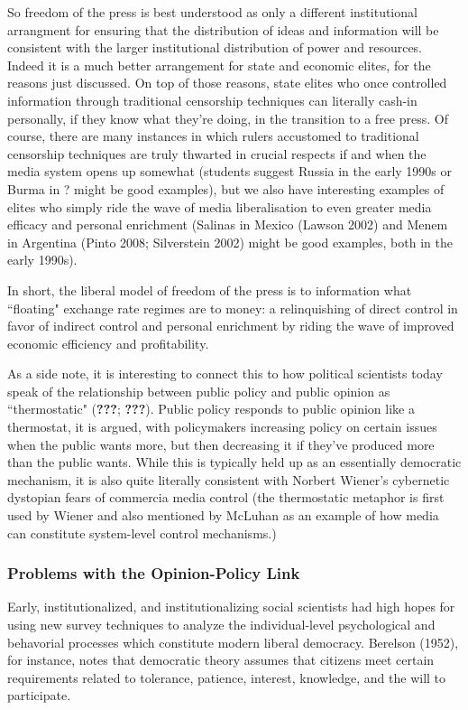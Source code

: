 \documentclass[12pt,book]{article}
\begin{document}
So freedom of the press is best understood as only a different
institutional arrangment for ensuring that the distribution of ideas and
information will be consistent with the larger institutional
distribution of power and resources. Indeed it is a much better
arrangement for state and economic elites, for the reasons just
discussed. On top of those reasons, state elites who once controlled
information through traditional censorship techniques can literally
cash-in personally, if they know what they're doing, in the transition
to a free press. Of course, there are many instances in which rulers
accustomed to traditional censorship techniques are truly thwarted in
crucial respects if and when the media system opens up somewhat
(students suggest Russia in the early 1990s or Burma in ? might be good
examples), but we also have interesting examples of elites who simply
ride the wave of media liberalisation to even greater media efficacy and
personal enrichment (Salinas in Mexico (Lawson 2002) and Menem in
Argentina (Pinto 2008; Silverstein 2002) might be good examples, both in
the early 1990s).

In short, the liberal model of freedom of the press is to information
what ``floating" exchange rate regimes are to money: a relinquishing of
direct control in favor of indirect control and personal enrichment by
riding the wave of improved economic efficiency and profitability.

As a side note, it is interesting to connect this to how political
scientists today speak of the relationship between public policy and
public opinion as ``thermostatic" ({\textbf{???}}; {\textbf{???}}).
Public policy responds to public opinion like a thermostat, it is
argued, with policymakers increasing policy on certain issues when the
public wants more, but then decreasing it if they've produced more than
the public wants. While this is typically held up as an essentially
democratic mechanism, it is also quite literally consistent with Norbert
Wiener's cybernetic dystopian fears of commercia media control (the
thermostatic metaphor is first used by Wiener and also mentioned by
McLuhan as an example of how media can constitute system-level control
mechanisms.)

\subsubsection{Problems with the Opinion-Policy
Link}\label{problems-with-the-opinion-policy-link}

Early, institutionalized, and institutionalizing social scientists had
high hopes for using new survey techniques to analyze the
individual-level psychological and behavorial processes which constitute
modern liberal democracy. Berelson (1952), for instance, notes that
democratic theory assumes that citizens meet certain requirements
related to tolerance, patience, interest, knowledge, and the will to
participate.
\end{document}
